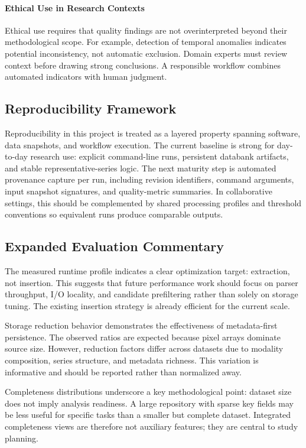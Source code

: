 \paragraph{Ethical Use in Research Contexts}
Ethical use requires that quality findings are not overinterpreted beyond their methodological scope. For example, detection of temporal anomalies indicates potential inconsistency, not automatic exclusion. Domain experts must review context before drawing strong conclusions. A responsible workflow combines automated indicators with human judgment.

\subsection{Reproducibility Framework}
Reproducibility in this project is treated as a layered property spanning software, data snapshots, and workflow execution. The current baseline is strong for day-to-day research use: explicit command-line runs, persistent databank artifacts, and stable representative-series logic. The next maturity step is automated provenance capture per run, including revision identifiers, command arguments, input snapshot signatures, and quality-metric summaries. In collaborative settings, this should be complemented by shared processing profiles and threshold conventions so equivalent runs produce comparable outputs.

\subsection{Expanded Evaluation Commentary}
The measured runtime profile indicates a clear optimization target: extraction, not insertion. This suggests that future performance work should focus on parser throughput, I/O locality, and candidate prefiltering rather than solely on storage tuning. The existing insertion strategy is already efficient for the current scale.

Storage reduction behavior demonstrates the effectiveness of metadata-first persistence. The observed ratios are expected because pixel arrays dominate source size. However, reduction factors differ across datasets due to modality composition, series structure, and metadata richness. This variation is informative and should be reported rather than normalized away.

Completeness distributions underscore a key methodological point: dataset size does not imply analysis readiness. A large repository with sparse key fields may be less useful for specific tasks than a smaller but complete dataset. Integrated completeness views are therefore not auxiliary features; they are central to study planning.


